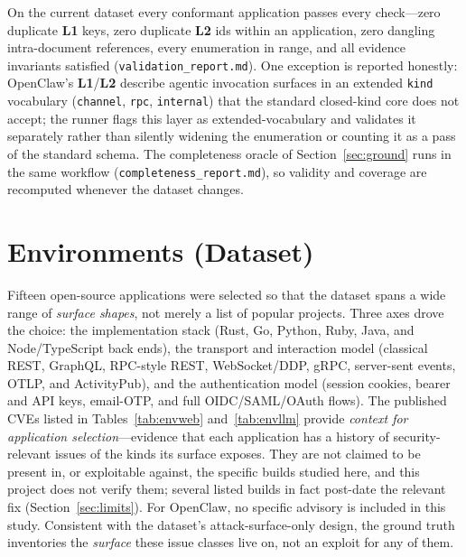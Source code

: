 \documentclass[11pt,a4paper]{article}
\newcommand{\cd}[1]{\lstinline[basicstyle=\ttfamily\small]|#1|}
\renewcommand{\L}[1]{\textbf{L#1}}
\begin{document}
On the current dataset every conformant application passes every check---zero duplicate \L1
keys, zero duplicate \L2 ids within an application, zero dangling intra-document references,
every enumeration in range, and all evidence invariants satisfied
(\cd{validation_report.md}). One exception is reported honestly: OpenClaw's \L1/\L2 describe
agentic invocation surfaces in an extended \cd{kind} vocabulary (\cd{channel}, \cd{rpc},
\cd{internal}) that the standard closed-kind core does not accept; the runner flags this layer
as extended-vocabulary and validates it separately rather than silently widening the
enumeration or counting it as a pass of the standard schema. The completeness oracle of
Section~\ref{sec:ground} runs in the same workflow (\cd{completeness_report.md}), so validity
and coverage are recomputed whenever the dataset changes.

\section{Environments (Dataset)}\label{sec:env}
Fifteen open-source applications were selected so that the dataset spans a wide range of
\emph{surface shapes}, not merely a list of popular projects. Three axes drove the choice:
the implementation stack (Rust, Go, Python, Ruby, Java, and Node/TypeScript back ends),
the transport and interaction model (classical REST, GraphQL, RPC-style REST,
WebSocket/DDP, gRPC, server-sent events, OTLP, and ActivityPub), and the authentication
model (session cookies, bearer and API keys, email-OTP, and full OIDC/SAML/OAuth flows).
The published CVEs listed in Tables~\ref{tab:envweb} and~\ref{tab:envllm} provide
\emph{context for application selection}---evidence that each application has a history of
security-relevant issues of the kinds its surface exposes. They are not claimed to be present
in, or exploitable against, the specific builds studied here, and this project does not verify
them; several listed builds in fact post-date the relevant fix (Section~\ref{sec:limits}). For
OpenClaw, no specific advisory is included in this study. Consistent with the dataset's
attack-surface-only design, the ground truth inventories the \emph{surface} these issue
classes live on, not an exploit for any of them.
\end{document}
